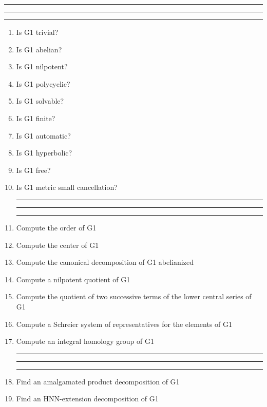 
\bigskip
\hrule\hrule\hrule

\begin{enumerate}

\item Is G1 trivial?

\item Is G1 abelian?

\item Is G1 nilpotent?

\item Is G1 polycyclic?

\item Is G1 solvable?

\item Is G1 finite?

\item Is G1 automatic?

\item Is G1 hyperbolic?

\item Is G1 free?

\item Is G1 metric small cancellation?

\bigskip
\hrule\hrule\hrule

\item Compute the order of G1

\item Compute the center of G1

\item Compute the canonical decomposition of G1 abelianized

\item Compute a nilpotent quotient of G1

\item Compute the quotient of two successive terms of the lower central
series of G1

\item Compute a Schreier system of representatives for the elements of G1

\item Compute an integral homology group of G1

\bigskip
\hrule\hrule\hrule

\item Find an amalgamated product decomposition of G1

\item Find an HNN-extension decomposition of G1


\end{enumerate}
